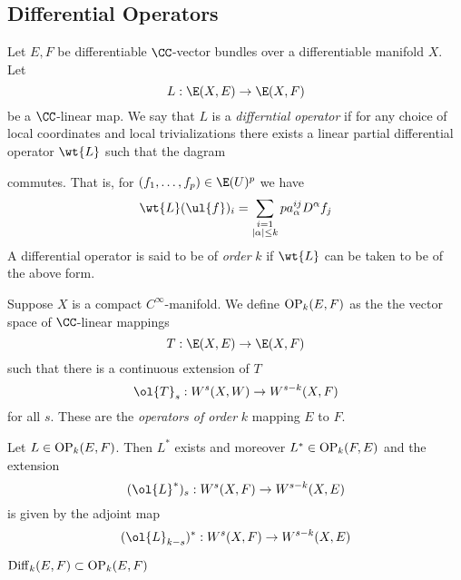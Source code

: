 \documentclass[12pt]{article}
\theoremstyle{plain}
\begin{document}
\subsection{Differential Operators}

\begin{defn} [1, p. 113]
Let $E, F$ be differentiable $\CC$-vector bundles over a differentiable manifold $X$. Let
\[ L : \E(X, E) \to \E(X, F) \]
be a $\CC$-linear map. We say that $L$ is a \textit{differntial operator} if for any choice of local coordinates and local trivializations there exists a linear partial differential operator $\wt{L}$ such that the dagram
\begin{center}
\end{center}
commutes. That is, for $(f_1, \dots, f_p) \in \E(U)^p$ we have
\[ \wt{L}(\ul{f})_i = \sum_{\substack{ i = 1 \\ |\alpha| \le k}}p a_\alpha^{ij} D^\alpha f_j \]
A differential operator is said to be of \textit{order} $k$ if $\wt{L}$ can be taken to be of the above form. 
\end{defn}

\begin{defn}
Suppose $X$ is a compact $C^\infty$-manifold. We define $\mathrm{OP}_k(E, F)$ as the the vector space of $\CC$-linear mappings
\[ T : \E(X, E) \to \E(X, F) \]
such that there is a continuous extension of $T$
\[ \ol{T}_s : W^s(X, W) \to W^{s-k}(X, F) \]
for all $s$. These are the \textit{operators of order} $k$ mapping $E$ to $F$. 
\end{defn}

\begin{prop} [1, Prop. 2.1]
Let $L \in \mathrm{OP}_k(E, F)$. Then $L^*$ exists and moreover $L^* \in \mathrm{OP}_k(F, E)$ and the extension
\[ (\ol{L}^*)_s : W^s(X, F) \to W^{s-k}(X, E) \]
is given by the adjoint map
\[ (\ol{L}_{k-s})^* : W^s(X, F) \to W^{s-k}(X, E) \]
\end{prop}
 
\begin{prop} [1, Prop. 2.2]
$\mathrm{Diff}_k(E, F) \subset \mathrm{OP}_k(E, F)$
\end{prop}
\end{document}
